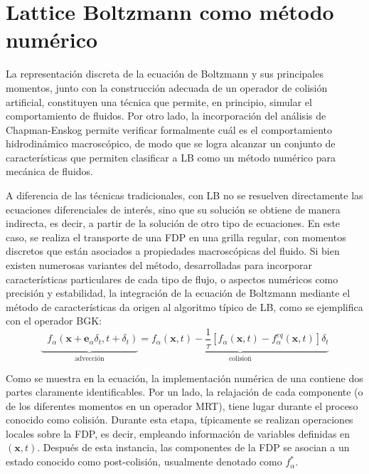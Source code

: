 \section{Lattice Boltzmann como m\'etodo num\'erico}

La representaci\'on discreta de la ecuaci\'on de Boltzmann y sus principales momentos, junto con la construcci\'on adecuada de un operador de colisi\'on artificial, constituyen una t\'ecnica que permite, en principio, simular el comportamiento de fluidos. Por otro lado, la incorporaci\'on del an\'alisis de Chapman-Enskog permite verificar formalmente cu\'al es el comportamiento hidrodin\'amico macrosc\'opico, de modo que se logra alcanzar un conjunto de caracter\'isticas que permiten clasificar a LB como un m\'etodo num\'erico para mec\'anica de fluidos.

A diferencia de las t\'ecnicas tradicionales, con LB no se resuelven directamente las ecuaciones diferenciales de inter\'es, sino que su soluci\'on se obtiene de manera indirecta, es decir, a partir de la soluci\'on de otro tipo de ecuaciones. En este caso, se realiza el transporte de una FDP en una grilla regular, con momentos discretos que est\'an asociados a propiedades macrosc\'opicas del fluido. Si bien existen numerosas variantes del m\'etodo, desarrolladas para incorporar caracter\'isticas particulares de cada tipo de flujo, o aspectos num\'ericos como precisi\'on y estabilidad, la integraci\'on de la ecuaci\'on de Boltzmann mediante el m\'etodo de caracter\'isticas da origen al algoritmo t\'ipico de LB, como se ejemplifica con el operador BGK:
\begin{equation}
	\underbrace{ \phantom{\dfrac{1}{\tau}} f_{\alpha}(\bm{x}+\bm{e}_{\alpha}\delta_t, t+\delta_t)}_{\mbox{advecci\'on}} = 
	\underbrace{ f_{\alpha}(\bm{x},t) -\dfrac{1}{\tau} \left[ f_{\alpha}(\bm{x},t) - f_{\alpha}^{eq}(\bm{x},t) \right]\delta_t}_{\mbox{colisio\'n}}
\end{equation}

Como se muestra en la ecuaci\'on, la implementaci\'on num\'erica de una \lbe{} contiene dos partes claramente identificables. Por un lado, la relajaci\'on de cada componente (o de los diferentes momentos en un operador MRT), tiene lugar durante el proceso conocido como colisi\'on. Durante esta etapa, t\'ipicamente se realizan operaciones locales sobre la FDP, es decir, empleando informaci\'on de variables definidas en $(\bm{x},t)$. Despu\'es de esta instancia, las componentes de la FDP se asocian a un estado conocido como post-colisi\'on, usualmente denotado como $f_{\alpha}^*$. 

